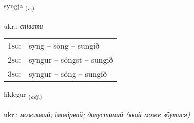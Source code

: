 \documentclass[frontgrid, backgrid]{flacards}\usepackage[]{graphicx}\usepackage[]{xcolor}
\begin{document}
\renewcommand{\flhead}{\vskip5pt \fboxsep=0pt {\small\bfseries\footnotesize Sagnorð | дієслово}}
\renewcommand{\fcfoot}{\vskip5pt \fboxsep=0pt \hspace{2pt}{\small\bfseries\footnotesize 1K}}

\renewcommand{\blhead}{\vskip5pt {\small\bfseries\footnotesize Sagnorð | дієслово }}
\renewcommand{\bcfoot}{\vskip5pt \hspace{2pt}{\small\bfseries\footnotesize 1K}}


{syngja \small{\textsubscript{(\textit{v.})}} \\[1ex] %
\textphonetic{[siɲca]} \\
ukr.: \emph{співати} \\  [2ex]
\renewcommand*{\arraystretch}{0.8}
\begin{tabular}{p{1cm}l}
\textsc{1sg}: & syng -- söng -- sungið \\ 
\textsc{2sg}: & syngur -- söngst -- sungið \\ 
\textsc{3sg}: & syngur -- söng -- sungið \\ 
\end{tabular}
}

\renewcommand{\flhead}{\vskip5pt \fboxsep=0pt {\small\bfseries\footnotesize Lýsingarorð | прикметник}}
\renewcommand{\fcfoot}{\vskip5pt \fboxsep=0pt \hspace{2pt}{\small\bfseries\footnotesize 1K}}

\renewcommand{\blhead}{\vskip5pt {\small\bfseries\footnotesize Lýsingarorð | прикметник }}
\renewcommand{\bcfoot}{\vskip5pt \hspace{2pt}{\small\bfseries\footnotesize 1K}}


{líklegur \small{\textsubscript{(\textit{adj.})}} \\[1ex] %
\textphonetic{[lihklɛɣʏr]} \\
ukr.: \emph{можливий; імовірний; допустимий (який може збутися)} \\  [2ex]
\renewcommand*{\arraystretch}{0.8}
}
\end{document}
